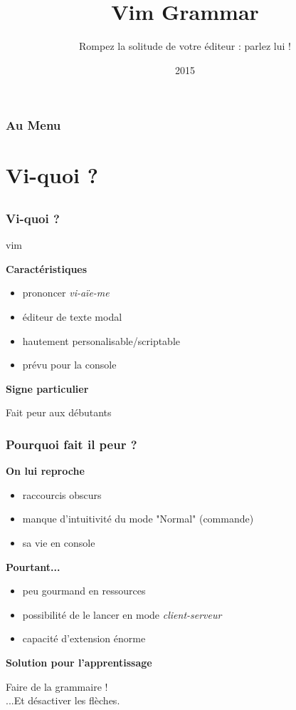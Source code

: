 \documentclass{beamer}
\title[Vim Grammar]{Vim Grammar}
\author{Rompez la solitude de votre éditeur : parlez lui !}
\institute{Mathieu (matael) Gaborit --- HAUM}
\date{2015}
\begin{document}
\begin{frame}
\titlepage
\end{frame}

\begin{frame}
\frametitle{Au Menu}
\tableofcontents
\end{frame}

\section{Vi-quoi ?}
\subsection{}
\frame{\tableofcontents[currentsection]}

\begin{frame}
\frametitle{Vi-quoi ?}
\begin{center}
vim
\end{center}
\pause{}

{\bf  Caractéristiques} 
\begin{itemize}
    \item prononcer {\it vi-aïe-me}
    \item éditeur de texte modal
    \item hautement personalisable/scriptable
    \item prévu pour la console
\end{itemize}

\pause{}
{\bf Signe particulier} 
\pause
\begin{center}
	\alert{Fait peur aux débutants}
\end{center}
\end{frame}

\begin{frame}
\frametitle{Pourquoi fait il peur ?}
{\bf On lui reproche}
\pause{}
\begin{itemize}
    \item raccourcis obscurs
    \item manque d'intuitivité du mode "Normal" (commande)
    \item sa vie en console
\end{itemize}

\pause{}

{\bf Pourtant...}
\pause{}
\begin{itemize}
    \item peu gourmand en ressources
    \item possibilité de le lancer en mode {\it client-serveur}
    \item capacité d'extension énorme
\end{itemize}

\pause{}
{\bf Solution pour l'apprentissage}
\pause{}
\begin{center}
Faire de la grammaire !\\
\scriptsize{...Et désactiver les flèches.}
\end{center}

\end{frame}
\end{document}
